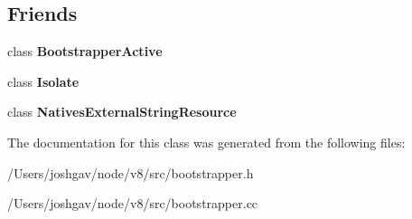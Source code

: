 \subsection*{Friends}
\begin{DoxyCompactItemize}
\item 
class {\bfseries Bootstrapper\+Active}\hypertarget{classv8_1_1internal_1_1_bootstrapper_a8d5d5e652a3096853b619c4dd4f99827}{}\label{classv8_1_1internal_1_1_bootstrapper_a8d5d5e652a3096853b619c4dd4f99827}

\item 
class {\bfseries Isolate}\hypertarget{classv8_1_1internal_1_1_bootstrapper_aba4f0964bdacf2bbf62cf876e5d28d0a}{}\label{classv8_1_1internal_1_1_bootstrapper_aba4f0964bdacf2bbf62cf876e5d28d0a}

\item 
class {\bfseries Natives\+External\+String\+Resource}\hypertarget{classv8_1_1internal_1_1_bootstrapper_a4434d79432d349e28ca43c4c89922578}{}\label{classv8_1_1internal_1_1_bootstrapper_a4434d79432d349e28ca43c4c89922578}

\end{DoxyCompactItemize}


The documentation for this class was generated from the following files\+:\begin{DoxyCompactItemize}
\item 
/\+Users/joshgav/node/v8/src/bootstrapper.\+h\item 
/\+Users/joshgav/node/v8/src/bootstrapper.\+cc\end{DoxyCompactItemize}
